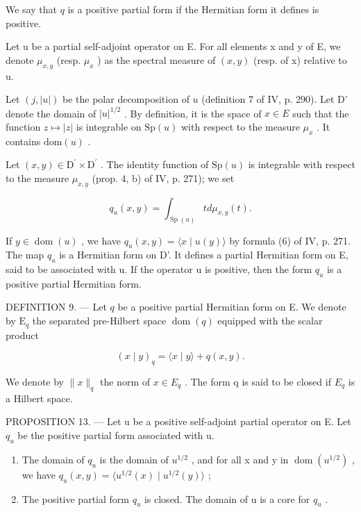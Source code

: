 We say that \(q\) is a positive partial form if the Hermitian form it defines is positive.

Let u be a partial self-adjoint operator on E. For all elements x and y of E, we denote \(\mu_{x,y}\) (resp. \(\mu_{x}\) ) as the spectral measure of \((x,y)\) (resp. of x) relative to u.

Let \((j, |u|)\) be the polar decomposition of \(u\) (definition 7 of IV, p. 290). Let D' denote the domain of \(|u|^{1/2}\) . By definition, it is the space of \(x \in E\) such that the function \(z \mapsto |z|\) is integrable on \(\mathrm{Sp}(u)\) with respect to the measure \(\mu_x\) . It contains \(\mathrm{dom}(u)\) .

Let \((x,y)\in\mathrm{D}^{\prime}\times\mathrm{D}^{\prime}\) . The identity function of \(\mathrm{Sp}(u)\) is integrable with respect to the measure \(\mu_{x,y}\) (prop. 4, b) of IV, p. 271); we set

\[
q _ {u} (x, y) = \int_ {\operatorname{Sp} (u)} t d \mu_ {x, y} (t).
\]

If \(y \in \operatorname{dom}(u)\) , we have \(q_u(x, y) = \langle x \mid u(y) \rangle\) by formula (6) of IV, p. 271. The map \(q_u\) is a Hermitian form on D'. It defines a partial Hermitian form on E, said to be associated with u. If the operator u is positive, then the form \(q_u\) is a positive partial Hermitian form.

DEFINITION 9. --- Let \(q\) be a positive partial Hermitian form on E. We denote by \(\mathrm{E}_q\) the separated pre-Hilbert space \(\operatorname{dom}(q)\) equipped with the scalar product

\[
(x \mid y) _ {q} = \langle x \mid y \rangle + q (x, y).
\]

We denote by \(\|x\|_{q}\) the norm of \(x \in E_{q}\) . The form q is said to be closed if \(E_{q}\) is a Hilbert space.

PROPOSITION 13. --- Let u be a positive self-adjoint partial operator on E. Let \(q_{u}\) be the positive partial form associated with u.

\begin{enumerate}
\def\labelenumi{\alph{enumi})}
\item
  The domain of \(q_{u}\) is the domain of \(u^{1/2}\) , and for all x and y in \(\operatorname{dom}(u^{1/2})\) , we have \(q_{u}(x,y)=\langle u^{1/2}(x)\mid u^{1/2}(y)\rangle\) ;
\item
  The positive partial form \(q_{u}\) is closed. The domain of u is a core for \(q_{u}\) .
\end{enumerate}

